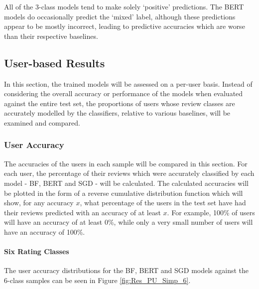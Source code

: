 All of the 3-class models tend to make solely `positive' predictions. The BERT models do occasionally predict the `mixed' label, although these predictions appear to be mostly incorrect, leading to predictive accuracies which are worse than their respective baselines.

\subsection{User-based Results}

In this section, the trained models will be assessed on a per-user basis. Instead of considering the overall accuracy or performance of the models when evaluated against the entire test set, the proportions of users whose review classes are accurately modelled by the classifiers, relative to various baselines, will be examined and compared.

\subsubsection{User Accuracy}

The accuracies of the users in each sample will be compared in this section. For each user, the percentage of their reviews which were accurately classified by each model - BF, BERT and SGD - will be calculated. The calculated accuracies will be plotted in the form of a reverse cumulative distribution function which will show, for any accuracy $x$, what percentage of the users in the test set have had their reviews predicted with an accuracy of at least $x$. For example, 100\% of users will have an accuracy of at least 0\%, while only a very small number of users will have an accuracy of 100\%.

\paragraph{Six Rating Classes}

The user accuracy distributions for the BF, BERT and SGD models against the 6-class samples can be seen in Figure \ref{fig:Res_PU_Simp_6}.


